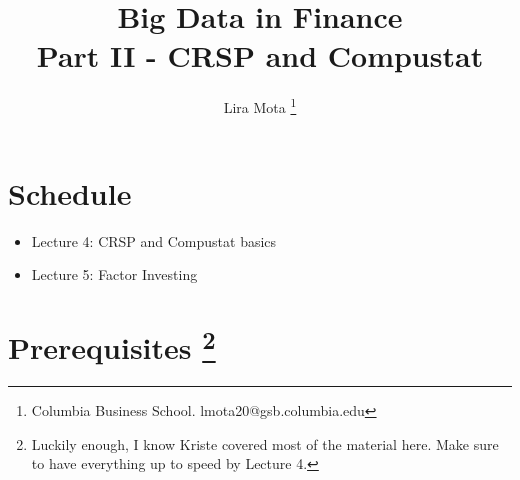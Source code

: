 \documentclass[12pts]{article}
\title{Big Data in Finance\\ \vspace{0.5cm} Part II - CRSP and Compustat}
\author{Lira Mota \thanks{Columbia Business School. lmota20@gsb.columbia.edu}}
\begin{document}
\maketitle

\section*{Schedule}

\begin{itemize}
	\item Lecture 4: CRSP and Compustat basics
	\item Lecture 5: Factor Investing 
\end{itemize}

\section*{Prerequisites \footnote{Luckily enough, I know Kriste covered most of the material here. Make sure to have everything up to speed by Lecture 4.}}
\end{document}
